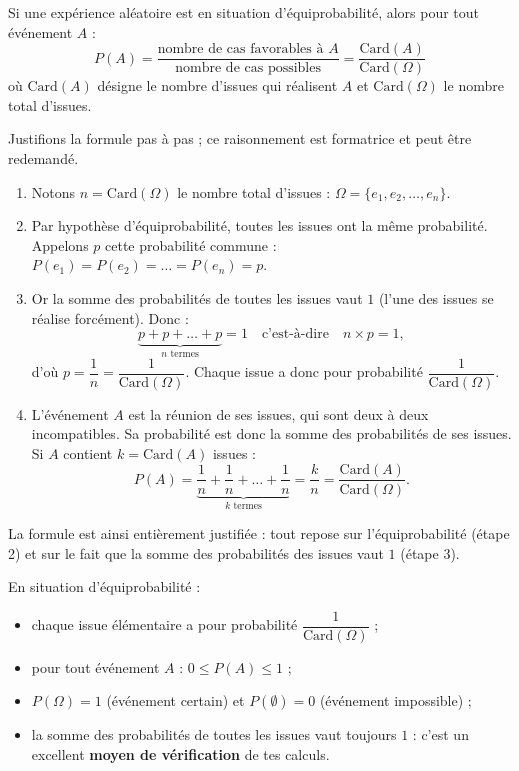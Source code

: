 \documentclass[11pt]{article}
\newcounter{popsec}
\newcounter{popsub}
\newcommand{\courssub}[1]{%
  \stepcounter{popsub}%
  \par\vspace{9pt}\noindent{\popxbold\fontsize{11.5}{13}\selectfont\color{popink}{\color{poporange}\thepopsec.\thepopsub}\hspace{6pt}#1}\par\nopagebreak\vspace{4pt}
}
\begin{document}
\courssub{La formule fondamentale}

\begin{propriete}
Si une expérience aléatoire est en situation d'équiprobabilité, alors pour tout événement $A$ :
\[
P(A) = \frac{\text{nombre de cas favorables à } A}{\text{nombre de cas possibles}} = \frac{\mathrm{Card}(A)}{\mathrm{Card}(\Omega)}
\]
où $\mathrm{Card}(A)$ désigne le nombre d'issues qui réalisent $A$ et $\mathrm{Card}(\Omega)$ le nombre total d'issues.
\end{propriete}

\begin{experience}
Justifions la formule pas à pas ; ce raisonnement est formatrice et peut être redemandé.
\begin{enumerate}
\item Notons $n = \mathrm{Card}(\Omega)$ le nombre total d'issues : $\Omega = \{e_1, e_2, \dots, e_n\}$.
\item Par hypothèse d'équiprobabilité, toutes les issues ont la même probabilité. Appelons $p$ cette probabilité commune : $P(e_1) = P(e_2) = \dots = P(e_n) = p$.
\item Or la somme des probabilités de toutes les issues vaut $1$ (l'une des issues se réalise forcément). Donc :
\[
\underbrace{p + p + \dots + p}_{n \text{ termes}} = 1 \quad \text{c'est-à-dire} \quad n \times p = 1,
\]
d'où $p = \dfrac{1}{n} = \dfrac{1}{\mathrm{Card}(\Omega)}$. Chaque issue a donc pour probabilité $\dfrac{1}{\mathrm{Card}(\Omega)}$.
\item L'événement $A$ est la réunion de ses issues, qui sont deux à deux incompatibles. Sa probabilité est donc la somme des probabilités de ses issues. Si $A$ contient $k = \mathrm{Card}(A)$ issues :
\[
P(A) = \underbrace{\frac{1}{n} + \frac{1}{n} + \dots + \frac{1}{n}}_{k \text{ termes}} = \frac{k}{n} = \frac{\mathrm{Card}(A)}{\mathrm{Card}(\Omega)}.
\]
\end{enumerate}
La formule est ainsi entièrement justifiée : tout repose sur l'équiprobabilité (étape 2) et sur le fait que la somme des probabilités des issues vaut $1$ (étape 3).
\end{experience}

\begin{aretenir}
En situation d'équiprobabilité :
\begin{itemize}
\item chaque issue élémentaire a pour probabilité $\dfrac{1}{\mathrm{Card}(\Omega)}$ ;
\item pour tout événement $A$ : $0 \le P(A) \le 1$ ;
\item $P(\Omega) = 1$ (événement certain) et $P(\emptyset) = 0$ (événement impossible) ;
\item la somme des probabilités de toutes les issues vaut toujours $1$ : c'est un excellent \textbf{moyen de vérification} de tes calculs.
\end{itemize}
\end{aretenir}
\end{document}
